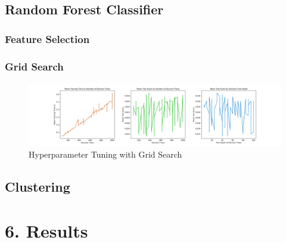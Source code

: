 \documentclass[10pt]{article}
\begin{document}
\subsection*{Random Forest Classifier}

\subsubsection*{Feature Selection}

\subsubsection*{Grid Search}

\begin{figure}[H]
\caption{Hyperparameter Tuning with Grid Search }
\centering
\includegraphics[scale=0.35]{gridsearch.png}
\end{figure}

\subsection*{Clustering}

\section*{6. Results}
\end{document}
